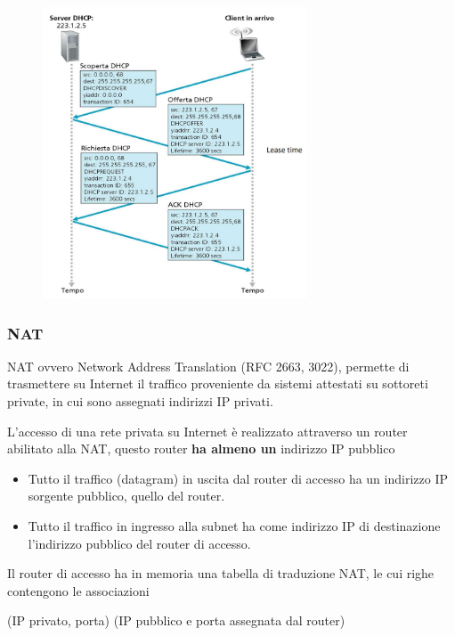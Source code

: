 \begin{figure}[H]
    \centering
    \includegraphics[width=0.7\textwidth]{immagini/DHCP.jpg}
\end{figure}

\subsubsection{NAT}

NAT ovvero Network Address Translation (RFC 2663, 3022), permette di trasmettere su Internet il traffico proveniente da sistemi attestati su sottoreti private, in cui sono assegnati indirizzi IP privati.

L'accesso di una rete privata su Internet è realizzato attraverso un router abilitato alla NAT, questo router \textbf{ha almeno un} indirizzo IP pubblico
\begin{itemize}
    \item Tutto il traffico (datagram) in uscita dal router di accesso ha un indirizzo IP sorgente pubblico, quello del router.
    \item Tutto il traffico in ingresso alla subnet ha come indirizzo IP di destinazione l’indirizzo pubblico del router di accesso.
\end{itemize}
Il router di accesso ha in memoria una tabella di traduzione NAT, le cui righe contengono le associazioni
\begin{center}
    (IP privato, porta) (IP pubblico e porta assegnata dal router)
\end{center}

